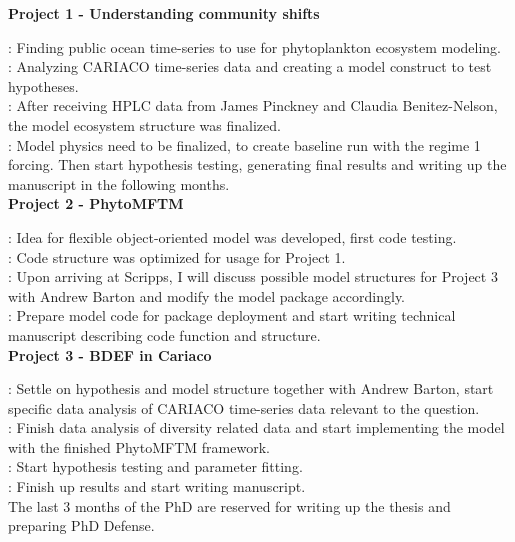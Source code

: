 {\bf{Project 1 - Understanding community shifts}}

: Finding public ocean time-series to use for phytoplankton ecosystem modeling.\\
: Analyzing CARIACO time-series data and creating a model construct to test hypotheses.\\
: After receiving HPLC data from James Pinckney and Claudia Benitez-Nelson, the model ecosystem structure was finalized. \\
: Model physics need to be finalized, to create baseline run with the regime 1 forcing. Then start hypothesis testing, generating final results and writing up the manuscript in the following months. \\


{\bf{Project 2 - PhytoMFTM}}

: Idea for flexible object-oriented model was developed, first code testing.\\
: Code structure was optimized for usage for Project 1.\\
: Upon arriving at Scripps, I will discuss possible model structures for Project 3 with Andrew Barton and modify the model package accordingly. \\
: Prepare model code for package deployment and start writing technical manuscript describing code function and structure. \\


{\bf{Project 3 - BDEF in Cariaco}}

: Settle on hypothesis and model structure together with Andrew Barton, start specific data analysis of CARIACO time-series data relevant to the question.\\
: Finish data analysis of diversity related data and start implementing the model with the finished PhytoMFTM framework.\\
: Start hypothesis testing and parameter fitting. \\
: Finish up results and start writing manuscript. \\


The last 3 months of the PhD are reserved for writing up the thesis and preparing PhD Defense.

